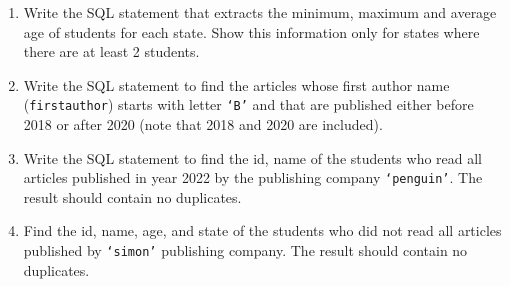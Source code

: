 \documentclass[letterpaper, 11pt]{article}
\begin{document}
\begin{enumerate}[label={\alph*}),leftmargin=*]
    \item Write the SQL statement that extracts the minimum, maximum and average age of students for each state. Show this information only for states where there are at least 2 students.
    \item Write the SQL statement to find the articles whose first author name (\texttt{first\textunderscore author}) starts with letter \texttt{`B'} and that are published either before 2018 or after 2020 (note that 2018 and 2020 are included).
    \item Write the SQL statement to find the id, name of the students who read all articles published in year 2022 by the publishing company \texttt{`penguin'}. The result should contain no duplicates.
    \item Find the id, name, age, and state of the students who did not read all articles published by \texttt{`simon'} publishing company. The result should contain no duplicates. 
\end{enumerate}
\end{document}
